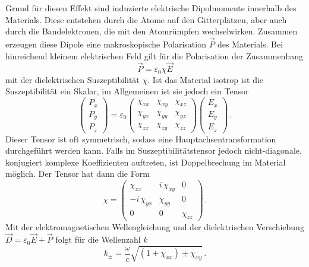 Grund für diesen Effekt sind induzierte elektrische Dipolmomente innerhalb des Materials. Diese entstehen durch die Atome
auf den Gitterplätzen, aber auch durch die Bandelektronen, die mit den Atomrümpfen wechselwirken. Zusammen erzeugen diese
Dipole eine makroskopische Polarisation $\vec{P}$ des Materials. Bei hinreichend kleinem elektrischen Feld gilt für die 
Polarisation der Zusammenhang
\begin{equation}
    \label{eq:Pol}
    \vec{P} = \varepsilon_0 \chi \vec{E}
\end{equation}
mit der dielektrischen Suszeptibilität $\chi$. Ist das Material isotrop ist die Suszeptibilität ein Skalar, im Allgemeinen
ist sie jedoch ein Tensor
\begin{equation*}
    \begin{pmatrix}
        P_x \\
        P_y \\
        P_z
    \end{pmatrix}
    = \varepsilon_0 \begin{pmatrix}
        \chi_{xx} & \chi_{xy} & \chi_{xz} \\
        \chi_{yx} & \chi_{yy} & \chi_{yz} \\
        \chi_{zx} & \chi_{zy} & \chi_{zz}
    \end{pmatrix}
    \begin{pmatrix}
        E_x \\
        E_y \\
        E_z 
    \end{pmatrix} \, .
\end{equation*}
Dieser Tensor ist oft symmetrisch, sodass eine Hauptachsentransformation durchgeführt werden kann. Falls im Suszeptibilitätstensor
jedoch nicht-diagonale, konjugiert komplexe Koeffizienten auftreten, ist Doppelbrechung im Material möglich.
Der Tensor hat dann die Form 
\begin{equation}
    \label{eq:tensor}
    \chi
    = \begin{pmatrix}
        \chi_{xx} & i \, \chi_{xy} & 0 \\
        - i \, \chi_{yx} & \chi_{yy} & 0 \\
        0 & 0 & \chi_{zz}
    \end{pmatrix} \, .
\end{equation}
Mit der elektromagnetischen Wellengleichung und der dielektrischen Verschiebung $\vec{D} = \varepsilon_0 \vec{E} + \vec{P}$
folgt für die Wellenzahl $k$
\begin{equation*}
    k_{\pm} = \frac{\omega}{c} \sqrt{\left(1 + \chi_{xx} \right) \pm \chi_{xy}} \, .
\end{equation*}
